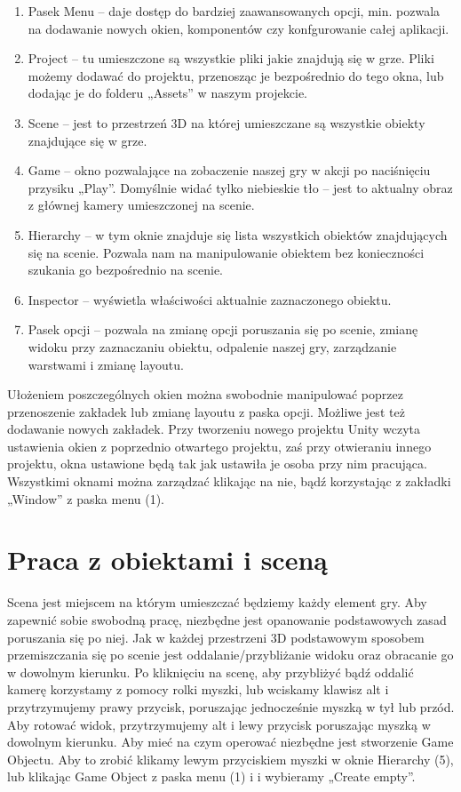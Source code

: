 \documentclass[brudnopis]{xmgr}
\begin{document}
\begin{enumerate}
  \item Pasek Menu – daje dostęp do bardziej zaawansowanych opcji, min. pozwala na dodawanie nowych okien, komponentów czy konfgurowanie całej aplikacji.
  \item  Project – tu umieszczone są wszystkie pliki jakie znajdują się w grze. Pliki możemy dodawać do projektu, przenosząc je bezpośrednio do tego okna, lub dodając je do folderu „Assets” w naszym projekcie. 
  \item Scene – jest to przestrzeń 3D na której umieszczane są wszystkie obiekty znajdujące się w grze. 
  \item Game – okno pozwalające na zobaczenie naszej gry w akcji po naciśnięciu przysiku „Play”. Domyślnie widać tylko niebieskie tło – jest to aktualny obraz z głównej kamery umieszczonej na scenie. 
  \item Hierarchy – w tym oknie znajduje się lista wszystkich obiektów znajdujących się na scenie. Pozwala nam na manipulowanie obiektem bez konieczności szukania go bezpośrednio na scenie. 
  \item Inspector – wyświetla właściwości aktualnie zaznaczonego obiektu.
  \item  Pasek opcji – pozwala na zmianę opcji poruszania się po scenie, zmianę widoku przy zaznaczaniu obiektu, odpalenie naszej gry, zarządzanie warstwami i zmianę layoutu.
\end{enumerate}

 Ułożeniem poszczególnych okien można swobodnie manipulować poprzez przenoszenie zakładek lub zmianę layoutu z paska opcji. Możliwe jest też dodawanie nowych zakładek. Przy tworzeniu nowego projektu Unity wczyta ustawienia okien z poprzednio otwartego projektu, zaś przy otwieraniu innego projektu, okna ustawione będą tak jak ustawiła je osoba przy nim pracująca. Wszystkimi oknami można zarządzać klikając na nie, bądź korzystając z zakładki „Window” z paska menu (1). 

\section{Praca z obiektami i sceną} 

Scena jest miejscem na którym umieszczać będziemy każdy element gry. Aby zapewnić sobie swobodną pracę, niezbędne jest opanowanie podstawowych zasad poruszania się po niej. Jak w każdej przestrzeni 3D podstawowym sposobem przemiszczania się po scenie jest oddalanie/przybliżanie widoku oraz obracanie go w dowolnym kierunku. Po kliknięciu na scenę, aby przybliżyć bądź oddalić kamerę korzystamy z pomocy rolki myszki, lub wciskamy klawisz alt i przytrzymujemy prawy przycisk, poruszając jednocześnie myszką w tył lub przód. Aby rotować widok, przytrzymujemy alt i lewy przycisk poruszając myszką w dowolnym kierunku. Aby mieć na czym operować niezbędne jest stworzenie Game Objectu. Aby to zrobić klikamy lewym przyciskiem myszki w oknie Hierarchy (5), lub klikając Game Object z paska menu (1) i i wybieramy „Create empty”. 
\end{document}
